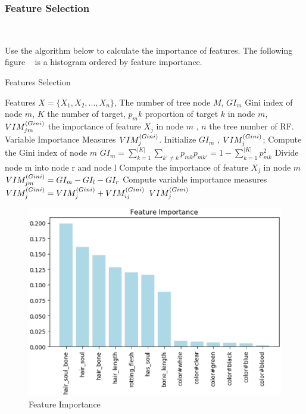 \subsubsection{Feature Selection}
\

Use the algorithm below to 
calculate the importance of features.
The following figure ~
is a histogram ordered by feature importance. 

\begin{algorithm}[htbp]
	\small
	\caption{Features Selection}
	\label{alg:features_selection}
	\begin{algorithmic}[1]
		\REQUIRE
		Features $X=\{ X_1, X_2, ... , X_n \}$,
		The number of tree node $M$,
		$GI_m$ Gini index of node $m$, 
		$ K $ the number of target,
		$ p_mk $ proportion of target $k$ in node $m$,
		$ VIM_{jm}^{\small(Gini)} $ the importance of feature $X_j$ in node $m$ ,
		$ n$ the tree number of RF.
		\ENSURE
		Variable Importance Measures $VIM_{j}^{\small(Gini)}$.
		\STATE
		Initialize $GI_m$ , 
		$VIM_{j}^{\small(Gini)} $;
		\STATE Compute the Gini index of node $m$
		$GI_m = \sum_{k=1}^{|K|} \sum_{k'\neq k} {p_{mk}}{p_{mk'}}=1- \sum_{k=1}^{|K|} p^2_{mk}$
		\ENDFOR
		\STATE Divide node m into node r and node l
		\STATE Compute the importance of feature $X_j$ in node $m$ 
		$VIM_{jm}^{\small(Gini)} = GI_m-GI_l-GI_r $
		\ENDFOR
		\STATE Compute variable importance measures 
		$VIM_{j}^{\small(Gini)} = VIM_{j}^{\small(Gini)} + VIM_{ij}^{\small(Gini)}$
		\ENDFOR
		\RETURN $VIM_{j}^{\small(Gini)}$
	\end{algorithmic}
\end{algorithm}

\begin{figure}[htbp]
	\centering
	\includegraphics[scale=0.3]{figures/FEATURE.eps}
	\caption{Feature Importance}\label{fig:feature_importance}
\end{figure}

